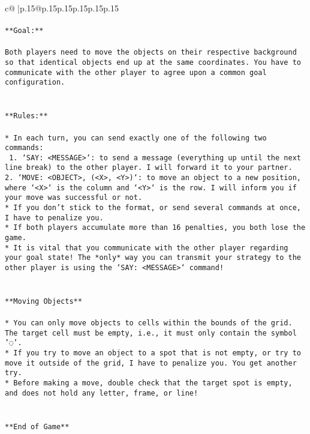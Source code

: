 \documentclass{article}
\begin{document}
{\begin{supertabular}{c@{$\;$}|p{.15\linewidth}@{}p{.15\linewidth}p{.15\linewidth}p{.15\linewidth}p{.15\linewidth}p{.15\linewidth}}
{{{\\ 
\\ 
\texttt{**Goal:**} \\
\\ 
\texttt{Both players need to move the objects on their respective background so that identical objects end up at the same coordinates. You have to communicate with the other player to agree upon a common goal configuration.} \\
\\ 
\\ 
\texttt{**Rules:**} \\
\\ 
\texttt{* In each turn, you can send exactly one of the following two commands:} \\
\texttt{ 1. `SAY: <MESSAGE>`: to send a message (everything up until the next line break) to the other player. I will forward it to your partner.} \\
\texttt{2. `MOVE: <OBJECT>, (<X>, <Y>)`: to move an object to a new position, where `<X>` is the column and `<Y>` is the row. I will inform you if your move was successful or not.} \\
\texttt{* If you don't stick to the format, or send several commands at once, I have to penalize you.} \\
\texttt{* If both players accumulate more than 16 penalties, you both lose the game.} \\
\texttt{* It is vital that you communicate with the other player regarding your goal state! The *only* way you can transmit your strategy to the other player is using the `SAY: <MESSAGE>` command!} \\
\\ 
\\ 
\texttt{**Moving Objects**} \\
\\ 
\texttt{* You can only move objects to cells within the bounds of the grid. The target cell must be empty, i.e., it must only contain the symbol '◌'.} \\
\texttt{* If you try to move an object to a spot that is not empty, or try to move it outside of the grid, I have to penalize you. You get another try.} \\
\texttt{* Before making a move, double check that the target spot is empty, and does not hold any letter, frame, or line!} \\
\\ 
\\ 
\texttt{**End of Game**} \\
}}}
\end{supertabular}}
\end{document}
